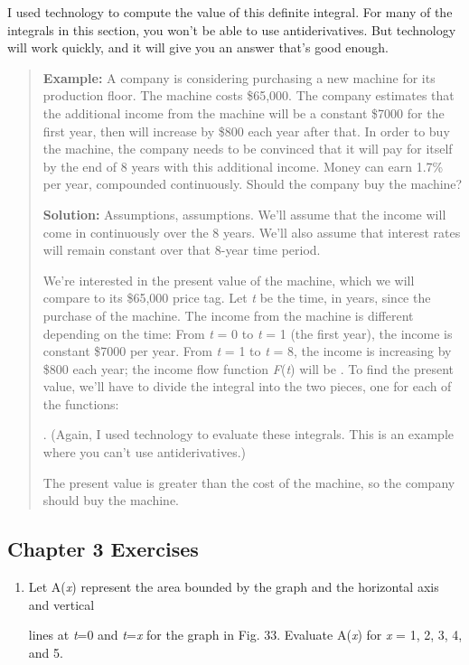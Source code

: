 I used technology to compute the value of this definite integral. For
many of the integrals in this section, you won't be able to use
antiderivatives. But technology will work quickly, and it will give you
an answer that's good enough.

\begin{quote}
\textbf{Example:} A company is considering purchasing a new machine for
its production floor. The machine costs \$65,000. The company estimates
that the additional income from the machine will be a constant \$7000
for the first year, then will increase by \$800 each year after that. In
order to buy the machine, the company needs to be convinced that it will
pay for itself by the end of 8 years with this additional income. Money
can earn 1.7\% per year, compounded continuously. Should the company buy
the machine?

\textbf{Solution:} Assumptions, assumptions. We'll assume that the
income will come in continuously over the 8 years. We'll also assume
that interest rates will remain constant over that 8-year time period.

We're interested in the present value of the machine, which we will
compare to its \$65,000 price tag. Let \emph{t} be the time, in years,
since the purchase of the machine. The income from the machine is
different depending on the time: From \emph{t} = 0 to \emph{t} = 1 (the
first year), the income is constant \$7000 per year. From \emph{t} = 1
to \emph{t} = 8, the income is increasing by \$800 each year; the income
flow function \emph{F}(\emph{t}) will be . To find the present value,
we'll have to divide the integral into the two pieces, one for each of
the functions:

. (Again, I used technology to evaluate these integrals. This is an
example where you can't use antiderivatives.)

The present value is greater than the cost of the machine, so the
company should buy the machine.
\end{quote}

\hypertarget{chapter-3-exercises}{\subsection{Chapter 3
Exercises}\label{chapter-3-exercises}}

\begin{enumerate}
\def\labelenumi{\arabic{enumi}.}
\item
  Let A(\emph{x}) represent the area bounded by the graph and the
  horizontal axis and vertical

  lines at \emph{t}=0 and \emph{t}=\emph{x} for the graph in Fig. 33.
  Evaluate A(\emph{x}) for \emph{x} = 1, 2, 3, 4, and 5.
\end{enumerate}

